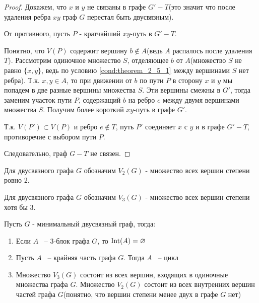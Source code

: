 \begin{proof}
	Докажем, что  $x$ и  $y$ не связаны в графе  $G' - T$(это значит что после удаления ребра $xy$ граф  $G$ перестал быть двусвязным).

	От противного, пусть $P$ - кратчайший  $xy$-путь в  $G' - T$.

	Понятно, что  $V(P)$ содержит вершину $b \not \in A$(ведь $A$ распалось после удаления  $T$).
	Рассмотрим одиночное множество $S$, отделяющее  $b$ от  $A$(множество $S$ не равно  $\{x, y\}$, ведь по условию \eqref{cond:theorem_2_5_1} между вершинами  $S$ нет ребра).
	Т.к. $x, y \in A$, то при движении от  $b$ по пути  $P$ в сторону $x$ и  $y$ мы попадем в две разные вершины множества  $S$.
	Эти вершины смежны в  $G'$, тогда заменим участок пути  $P$, содержащий  $b$ на ребро  $e$ между двумя вершинами множества  $S$.
	Получим более короткий  $xy$-путь в графе $G'$.

	Т.к. $V(P') \subset V(P)$ и ребро  $e \not \in T$, путь $P'$ соединяет  $x$ с  $y$ и в графе  $G' - T$, противоречие с выбором пути  $P$.

	Следовательно, граф  $G - T$ не связен.


\end{proof}

\begin{df*}[$V_2(G)$]
	Для двусвязного графа $G$ обозначим  $V_2(G)$ - множество всех вершин степени ровно 2.
\end{df*}

\begin{df*}[$V_3(G)$]
	Для двусвязного графа $G$ обозначим  $V_3(G)$ - множество всех вершин степени хотя бы 3.
\end{df*}

\begin{customcrly}{2.5} \label{corollary:2_5}
	Пусть $G$ - минимальный двусвязный граф, тогда:

	\begin{enumerate}
		\item Если $A$ ~-- 3-блок графа  $G$, то  $\operatorname{Int}(A) = \varnothing$
		\item Пусть  $A$ ~-- крайняя часть графа  $G$. Тогда  $A$ ~-- цикл 
		\item Множество  $V_3(G)$ состоит из всех вершин, входящих в одиночные множества графа  $G$.
		Множество  $V_2(G)$ состоит из всех внутренних вершин частей графа  $G$(понятно, что вершин степени менее двух в графе $G$ нет)
	\end{enumerate}

\end{customcrly}

